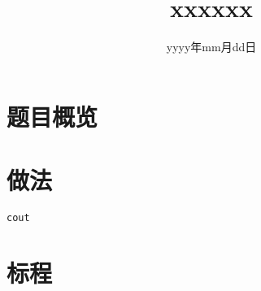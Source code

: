 \documentclass{ctsol}
\title{xxxxxx}
\date{yyyy年mm月dd日}
\begin{document}
\maketitle
{}

\section*{题目概览}

\solutiontab

\makesolution
\section*{做法}

\verb|cout|

\section*{标程}

\end{document}
